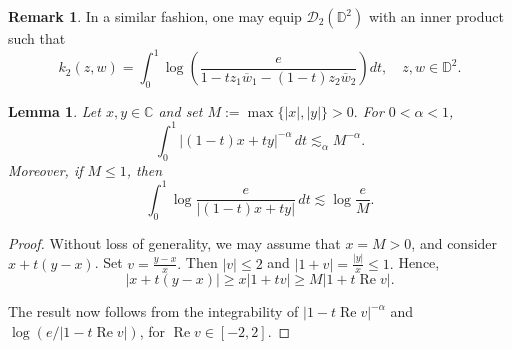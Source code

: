 \documentclass[a4paper,12pt]{amsart}
\newtheorem{lem}[thm]{Lemma}
\theoremstyle{definition}
\newtheorem{rem}[thm]{Remark}
\def\D{\mathbb D}
\begin{document}
\begin{rem}\label{rem:kernel-beta-two}
    In a similar fashion, one may equip $\mathcal D_2(\D^2)$ with an inner product such that
    \begin{equation*}
        k_{2}(z,w) = \int_0^1 \log\left(\frac{e}{1 - t z_1 \overline{w}_1 - (1-t) z_2 \overline{w}_2 }\right)  dt, 
    \quad z,w \in \mathbb{D}^2.
    \end{equation*}
\end{rem}

\begin{lem}\label{lem:segment-integral-estimates}
Let $x,y\in\mathbb C$ and set $M:=\max\{|x|,|y|\}>0.$
For $0<\alpha<1$,
\begin{equation}\label{eq:affine-power-estimate}
    \int_0^1|(1-t)x+t y|^{-\alpha}\,dt
    \lesssim_\alpha M^{-\alpha}.
\end{equation}
Moreover, if $M\leq1$, then
\begin{equation}\label{eq:affine-log-estimate}
    \int_0^1\log\frac{e}{|(1-t)x+ty|}\,dt
    \lesssim\log\frac{e}{M}.
\end{equation}
\end{lem}

\begin{proof}
Without loss of generality,
we may assume that
    $x=M>0$,
and consider $x+t(y-x)$. Set
$v=\frac{y-x}{x}.$
Then $|v|\leq2$ and
$
    |1+v|=\frac{|y|}{x}\leq1.
$
Hence,
\[
    |x+t(y-x)| \geq x |1+t  v|
    \geq M |1+t \operatorname{Re} v|.
\]

The result now follows from the integrability of $|1- t \operatorname{Re} v |^{-\alpha}$ and $\log(e/|1- t \operatorname{Re} v|)$, for $\operatorname{Re}v\in[-2,2]$.
\end{proof}
\end{document}
